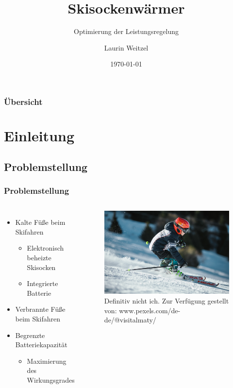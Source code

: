\documentclass{beamer}
\title{Skisockenwärmer}
\subtitle{Optimierung der Leistungsregelung}
\author{Laurin Weitzel}
\institute{Simulation mit pSpice}
\date{\today}
\begin{document}
	\begin{frame}
		\titlepage
	\end{frame}
	\begin{frame}
		\frametitle{Übersicht}
		\tableofcontents
	\end{frame}
	\section{Einleitung}
	\subsection{Problemstellung}
	\begin{frame}
		\frametitle{Problemstellung}
		\begin{columns}
			\column{0.5\textwidth}
			\begin{itemize}
				\item{Kalte Füße beim Skifahren}
				\begin{itemize}
					\item{Elektronisch beheizte Skisocken}
					\item{Integrierte Batterie}
				\end{itemize}
				\item{Verbrannte Füße beim Skifahren}
				\item{Begrenzte Batteriekapazität}
				\begin{itemize}
					\item{Maximierung des Wirkungsgrades}
				\end{itemize}
			\end{itemize}
			\column{0.5\textwidth}
			\begin{figure}[tbh]
				\centering
				\includegraphics[width=1\linewidth]{medien/skifahrer.jpg}
				\caption[Nicht ich auf Skiern.]{Definitiv nicht ich. Zur Verfügung gestellt von: www.pexels.com/de-de/@visitalmaty/}
				\label{fig:skifahrer}
			\end{figure}
		\end{columns}
	\end{frame}
\end{document}
